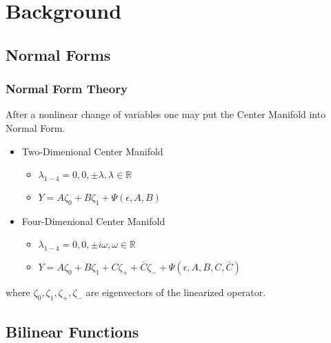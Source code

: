 \documentclass[10pt]{beamer}
\begin{document}

\section{Background}
\subsection{Normal Forms}

\frame
{
    \frametitle{Normal Form Theory}
    After a nonlinear change of variables \cite{IA} one may put the Center Manifold into Normal Form.

   \begin{itemize}
   \item Two-Dimenional Center Manifold 
        \begin{itemize}
        \item $\lambda_{1-4} = 0, 0 , \pm \lambda, \lambda \in \mathbb{R} $
        \item $ Y = A \zeta_0 + B \zeta_1 + \Psi(\epsilon, A,B) $
        \end{itemize}
   \item Four-Dimenional Center Manifold 
        \begin{itemize}
        \item $\lambda_{1-4} = 0, 0 , \pm i \omega, \omega \in \mathbb{R} $
        \item $ Y = A \zeta_0 + B \zeta_1 + C \zeta_+ + \bar{C} \zeta_- + \Psi(\epsilon, A,B,C,\bar{C}) $
        \end{itemize}
    \end{itemize}

    where $\zeta_0, \zeta_1, \zeta_+, \zeta_-$ are eigenvectors of the linearized operator.
}

\subsection{Bilinear Functions}
\end{document}
